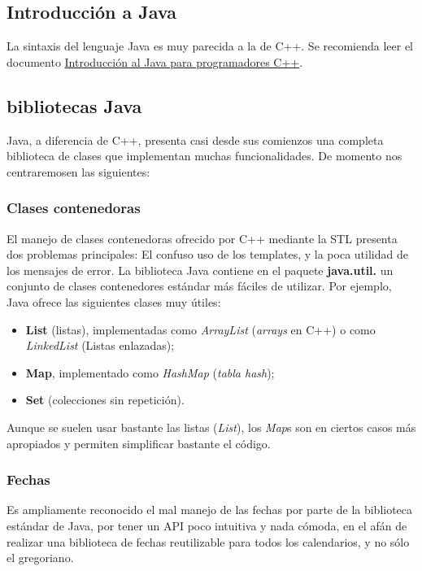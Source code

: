 \documentclass[11pt]{article}
\begin{document}
\subsection{Introducción a Java} \label{sec-2-1}
\label{fd70e36c-20a8-4577-90be-f671166ae3f1}


La sintaxis del lenguaje Java es muy parecida a la de C++. Se recomienda leer el
documento \href{http://www.xtec.es/~acastan/textos/Java.pdf}{Introducción al
Java para programadores C++}.


\subsection{bibliotecas Java} \label{sec-2-2} Java, a diferencia de C++,
presenta casi desde sus comienzos una completa biblioteca de clases que
implementan muchas funcionalidades. De momento nos centraremosen las siguientes:

\subsubsection{Clases contenedoras} \label{sec-2-2-1} El manejo de clases
contenedoras ofrecido por C++ mediante la STL presenta dos problemas
principales: El confuso uso de los templates, y la poca utilidad de los mensajes
de error. La biblioteca Java contiene en el paquete \textbf{java.util.\*} un
conjunto de clases contenedores estándar más fáciles de utilizar. Por ejemplo,
Java ofrece las siguientes clases muy útiles:

\begin{itemize} \item \textbf{List} (listas), implementadas como
\emph{ArrayList} (\emph{arrays} en C++) o como \emph{LinkedList} (Listas
enlazadas); \item \textbf{Map}, implementado como \emph{HashMap} (\emph{tabla
hash}); \item \textbf{Set} (colecciones sin repetición). \end{itemize}

Aunque se suelen usar bastante las listas (\emph{List}), los \emph{Map}s son en
ciertos casos más apropiados y permiten simplificar bastante el código.

\subsubsection{Fechas} \label{sec-2-2-2} Es ampliamente reconocido el mal manejo
de las fechas por parte de la biblioteca estándar de Java, por tener un API poco
intuitiva y nada cómoda, en el afán de realizar una biblioteca de fechas
reutilizable para todos los calendarios, y no sólo el gregoriano.
\end{document}
